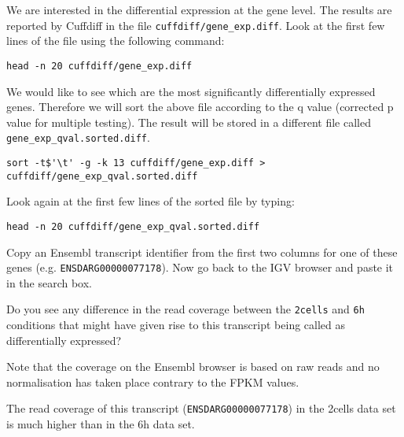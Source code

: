 \begin{steps}
We are interested in the differential expression at the gene level. The results
are reported by Cuffdiff in the file \texttt{cuffdiff/gene\_exp.diff}. 
Look at the first few lines of the file using the following command:
\begin{lstlisting}
head -n 20 cuffdiff/gene_exp.diff
\end{lstlisting}

We would like to see which are the most significantly differentially expressed
genes. Therefore we will sort the above file according to the q value
(corrected p value for multiple testing). The result will be stored in a
different file called \texttt{gene\_exp\_qval.sorted.diff}.
\begin{lstlisting}
sort -t$'\t' -g -k 13 cuffdiff/gene_exp.diff > cuffdiff/gene_exp_qval.sorted.diff
\end{lstlisting}

Look again at the first few lines of the sorted file by typing:
\begin{lstlisting}
head -n 20 cuffdiff/gene_exp_qval.sorted.diff
\end{lstlisting}

Copy an Ensembl transcript identifier from the first two columns for one of
these genes (e.g. \texttt{ENSDARG00000077178}). Now go back to the IGV browser
and paste it in the search box.
\end{steps}

\begin{questions}
Do you see any difference in the read coverage between the \texttt{2cells} and
\texttt{6h} conditions that might have given rise to this transcript being
called as differentially expressed?
\begin{warning}
Note that the coverage on the Ensembl browser is based on raw reads and no
normalisation has taken place contrary to the FPKM values.
\end{warning}

\begin{answer}
The read coverage of this transcript (\texttt{ENSDARG00000077178}) in the 2cells
data set is much higher than in the 6h data set.
\end{answer}

\end{questions}

